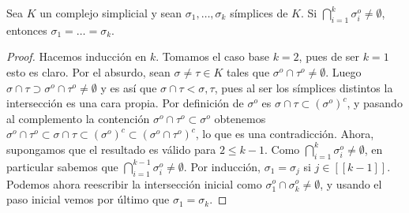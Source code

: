 \documentclass[11pt]{article}
\newcommand{\tint}[1]{#1^o}%
\newcommand{\nat}[1]{[\![#1]\!]}
\newcommand{\paint}[2]{\color{#1}{#2}}
\newenvironment{lemma}[2][Lema]{\begin{trivlist}
\item[\hskip \labelsep \paint{grey-light-blue}{{\bfseries #1}}\hskip \labelsep {\bfseries #2.}]}{\end{trivlist}}
\begin{document}
\begin{lemma}{2} Sea $K$ un complejo simplicial y sean $\sigma_1, \dots, \sigma_k$ s\'implices de $K$. Si $\bigcap_{i=1}^k\tint{\sigma_i} \neq \emptyset$, entonces $\sigma_1 = \dots = \sigma_k$.
\end{lemma}
\begin{proof} Hacemos inducci\'on en $k$. Tomamos el caso base $k = 2$, pues de ser $k = 1$ esto es claro. Por el absurdo, sean $\sigma \neq \tau \in K$ tales que $\tint{\sigma} \cap \tint{\tau} \neq \emptyset$. Luego $\sigma \cap \tau \supset \tint{\sigma} \cap \tint{\tau} \neq \emptyset$ y es as\'i que $\sigma \cap \tau < \sigma, \tau$, pues al ser los s\'implices distintos la intersecci\'on es una cara propia. Por definici\'on de $\tint{\sigma}$ es $\sigma \cap \tau \subset (\tint{\sigma})^c$, y pasando al complemento la contenci\'on $\tint{\sigma} \cap \tint{\tau} \subset \tint{\sigma}$ obtenemos $\tint{\sigma} \cap \tint{\tau} \subset  \sigma \cap \tau \subset (\tint{\sigma})^c \subset (\tint{\sigma} \cap \tint{\tau})^c$, lo que es una contradicci\'on. Ahora, supongamos que el resultado es v\'alido para $2 \leq k-1$. Como $\bigcap_{i = 1}^k \tint{\sigma_i} \neq \emptyset$, en particular sabemos que $\bigcap_{i = 1}^{k-1}\tint{\sigma_i} \neq \emptyset$. Por inducci\'on, $\sigma_1 = \sigma_j$ si $j \in \nat{k-1}$. Podemos ahora reescribir la intersecci\'on inicial como $\tint{\sigma_1} \cap \tint{\sigma_k} \neq \emptyset$, y usando el paso inicial vemos por \'ultimo que $\sigma_1 = \sigma_k$.
\end{proof}
\end{document}
